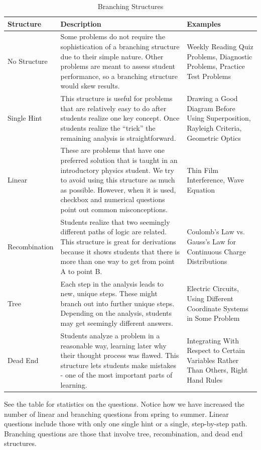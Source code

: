 \begin{table}[!ht]
  \centering
  \begin{tabular}{|p{2.7cm}|p{5.4cm}|p{4.6cm}|}
    \hline
    \textbf{Structure} & \textbf{Description} & \textbf{Examples}\\
	\hline
	No Structure & Some problems do not require the sophistication of a branching structure due to their simple nature. Other problems are meant to assess student performance, so a branching structure would skew results.
 & Weekly Reading Quiz Problems, Diagnostic Problems, Practice Test Problems\\
	\hline
	Single Hint & This structure is useful for problems that are relatively easy to do after students realize one key concept. Once students realize the ``trick'' the remaining analysis is straightforward. & Drawing a Good Diagram Before Using Superposition, Rayleigh Criteria, Geometric Optics\\
	\hline
	Linear & These are problems that have one preferred solution that is taught in an introductory physics student. We try to avoid using this structure as much as possible. However, when it is used, checkbox and numerical questions point out common misconceptions. & Thin Film Interference, Wave Equation\\
	\hline
	Recombination & Students realize that two seemingly different paths of logic are related. This structure is great for derivations because it shows students that there is more than one way to get from point A to point B.
 & Coulomb’s Law vs. Gauss’s Law for Continuous Charge Distributions\\
	\hline
	Tree & Each step in the analysis leads to new, unique steps. These might branch out into further unique steps. Depending on the analysis, students may get seemingly different answers. & Electric Circuits, Using Different Coordinate Systems in Some Problem\\
	\hline
	Dead End & Students analyze a problem in a reasonable way, learning later why their thought process was flawed. This structure lets students make mistakes - one of the most important parts of learning. & Integrating With Respect to Certain Variables Rather Than Others, Right Hand Rules\\
	\hline
  \end{tabular}
  \caption{Branching Structures}
  \label{tab:structures}
\end{table}

See the table for statistics on the questions. Notice how we have increased the number of linear and branching questions from spring to summer. Linear questions include those with only one single hint or a single, step-by-step path. Branching questions are those that involve tree, recombination, and dead end structures.

